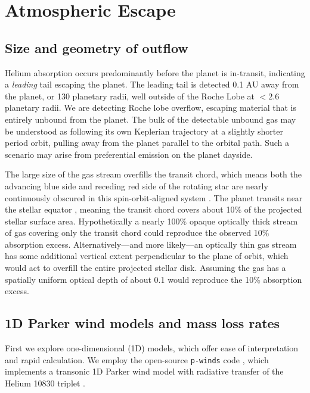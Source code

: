 \documentclass[twocolumn]{aastex631}
\begin{document}
\section{Atmospheric Escape}\label{secResults}

\subsection{Size and geometry of outflow}
Helium absorption occurs predominantly before the planet is in-transit, indicating a \emph{leading} tail escaping the planet.  The leading tail is detected 0.1 AU away from the planet, or 130 planetary radii, well outside of the Roche Lobe at $<2.6$ planetary radii.  We are detecting Roche lobe overflow, escaping material that is entirely unbound from the planet.  The bulk of the detectable unbound gas may be understood as following its own Keplerian trajectory at a slightly shorter period orbit, pulling away from the planet parallel to the orbital path.  Such a scenario may arise from preferential emission on the planet dayside.

The large size of the gas stream overfills the transit chord, which means both the advancing blue side and receding red side of the rotating star are nearly continuously obscured in this spin-orbit-aligned system \citep{2017AJ....153..211Z}. The planet transits near the stellar equator \citep{2017AJ....153..211Z}, meaning the transit chord covers about 10$\%$ of the projected stellar surface area.  Hypothetically a nearly 100$\%$ opaque optically thick stream of gas covering only the transit chord could reproduce the observed 10$\%$ absorption excess.  Alternatively---and more likely---an optically thin gas stream has some additional vertical extent perpendicular to the plane of orbit, which would act to overfill the entire projected stellar disk.  Assuming the gas has a spatially uniform optical depth of about 0.1 would reproduce the 10\% absorption excess.


\subsection{1D Parker wind models and mass loss rates}\label{pwinds}
First we explore one-dimensional (1D) models, which offer ease of interpretation and rapid calculation.  We employ the open-source \texttt{p-winds} code \citep{2022A&A...659A..62D}, which implements a transonic 1D Parker wind model with radiative transfer of the Helium 10830 triplet \citep{2018ApJ...855L..11O,2020A&A...636A..13L}.
\end{document}
